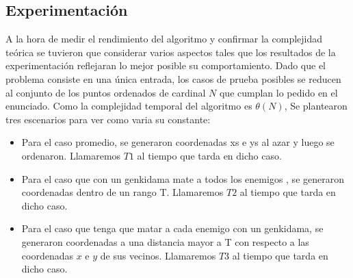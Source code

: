     \subsection{Experimentación}

    A la hora de medir el rendimiento del algoritmo y confirmar la complejidad teórica se tuvieron que
	considerar varios aspectos tales que los resultados de la experimentación reflejaran lo mejor posible su
	comportamiento.
	Dado que el problema consiste en una única entrada, los casos de prueba posibles se reducen al
	conjunto de los puntos ordenados de cardinal $N$ que cumplan lo pedido en el enunciado. Como la complejidad temporal del algoritmo es $\theta(N)$, Se plantearon tres escenarios para ver como varia su constante:
	\begin{itemize}
		\item{Para el caso promedio, se generaron coordenadas xs e ys al azar y luego se ordenaron. Llamaremos $T1$ al tiempo que tarda en dicho caso.}
		\item{Para el caso que con un genkidama mate a todos los enemigos , se generaron coordenadas dentro de un rango T. Llamaremos $T2$ al tiempo que tarda en dicho caso.}
		\item{Para el caso que tenga que matar a cada enemigo con un genkidama, se generaron coordenadas a una distancia mayor a T con respecto a las coordenadas $x$ e $y$ de sus vecinos. Llamaremos $T3$ al tiempo que tarda en dicho caso.}
	\end{itemize}

    \renewcommand\constante{11.5}

	\begin{figure}[H]
		\centering
		\caption{}
		\label{fig:tiempo_sobre_n}
	\end{figure}

